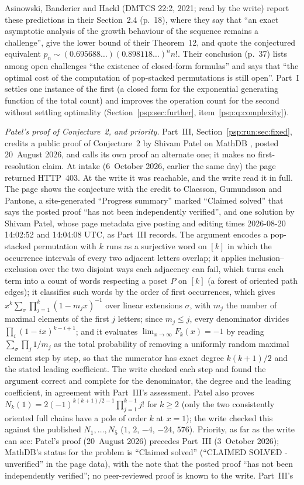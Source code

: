 \documentclass[11pt,letterpaper]{article}
\numberwithin{equation}{section}
\theoremstyle{remark}\newtheorem{remark}[theorem]{Remark}
\begin{document}
Asinowski, Banderier and Hackl \cite{abh} (DMTCS 22:2, 2021; read by the write) report these predictions in their Section~2.4 (p.~18), where they say that ``an exact asymptotic analysis of the growth behaviour of the sequence remains a challenge'', give the lower bound of their Theorem~12, and quote the conjectured equivalent $p_n\sim(0.695688\ldots)(0.898118\ldots)^nn!$. Their conclusion (p.~37) lists among open challenges ``the existence of closed-form formulas'' and says that ``the optimal cost of the computation of pop-stacked permutations is still open''. Part~I settles one instance of the first (a closed form for the exponential generating function of the total count) and improves the operation count for the second without settling optimality (Section~\ref{psp:sec:further}, item~\ref{psp:q:complexity}).

\emph{Patel's proof of Conjecture~2, and priority.} Part~III, Section~\ref{psp:run:sec:fixed}, credits a public proof of Conjecture~2 by Shivam Patel on MathDB \cite{patel}, posted 20~August 2026, and calls its own proof an alternate one; it makes no first-resolution claim. At intake (6~October 2026, earlier the same day) the page returned HTTP~403. At the write it was reachable, and the write read it in full. The page shows the conjecture with the credit to Claesson, Gu\dh mundsson and Pantone, a site-generated ``Progress summary'' marked ``Claimed solved'' that says the posted proof ``has not been independently verified'', and one solution by Shivam Patel, whose page metadata give posting and editing times 2026-08-20 14:02:52 and 14:04:08 UTC, as Part~III records. The argument encodes a pop-stacked permutation with $k$ runs as a surjective word on $[k]$ in which the occurrence intervals of every two adjacent letters overlap; it applies inclusion--exclusion over the two disjoint ways each adjacency can fail, which turns each term into a count of words respecting a poset $P$ on $[k]$ (a forest of oriented path edges); it classifies such words by the order of first occurrences, which gives $x^k\sum_\sigma\prod_{j=1}^k(1-m_jx)^{-1}$ over linear extensions $\sigma$, with $m_j$ the number of maximal elements of the first $j$ letters; since $m_j\le j$, every denominator divides $\prod_i(1-ix)^{k-i+1}$; and it evaluates $\lim_{x\to\infty}F_k(x)=-1$ by reading $\sum_\sigma\prod_j1/m_j$ as the total probability of removing a uniformly random maximal element step by step, so that the numerator has exact degree $k(k+1)/2$ and the stated leading coefficient. The write checked each step and found the argument correct and complete for the denominator, the degree and the leading coefficient, in agreement with Part~III's assessment. Patel also proves $N_k(1)=2(-1)^{k(k+1)/2-1}\prod_{j=1}^{k-1}j!$ for $k\ge2$ (only the two consistently oriented full chains have a pole of order $k$ at $x=1$); the write checked this against the published $N_1,\dots,N_5$ ($1$, $2$, $-4$, $-24$, $576$). Priority, as far as the write can see: Patel's proof (20~August 2026) precedes Part~III (3~October 2026); MathDB's status for the problem is ``Claimed solved'' (``CLAIMED SOLVED - unverified'' in the page data), with the note that the posted proof ``has not been independently verified''; no peer-reviewed proof is known to the write. Part~III's 
\end{document}
